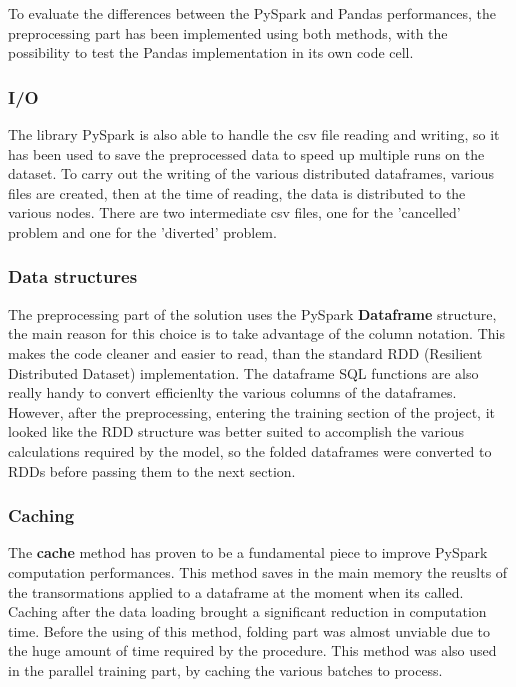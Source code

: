 \documentclass[
	letterpaper, %
	10pt, %
]{class}
\begin{document}
To evaluate the differences between the PySpark and Pandas performances, the preprocessing part has been implemented using both methods, with the possibility to test the Pandas implementation in its own code cell.

\subsubsection{I/O}

The library PySpark is also able to handle the csv file reading and writing, so it has been used to save the preprocessed data to speed up multiple runs on the dataset. To carry out the writing of the various distributed dataframes, various files are created, then at the time of reading, the data is distributed to the various nodes. There are two intermediate csv files, one for the 'cancelled' problem and one for the 'diverted' problem.\\

\subsubsection{Data structures}

The preprocessing part of the solution uses the PySpark \textbf{Dataframe} structure, the main reason for this choice is to take advantage of the column notation. This makes the code cleaner and easier to read, than the standard RDD (Resilient Distributed Dataset) implementation. The dataframe SQL functions are also really handy to convert efficienlty the various columns of the dataframes.
However, after the preprocessing, entering the training section of the project, it looked like the RDD structure was better suited to accomplish the various calculations required by the model, so the folded dataframes were converted to RDDs before passing them to the next section.

\subsubsection{Caching}

The \textbf{cache} method has proven to be a fundamental piece to improve PySpark computation performances. This method saves in the main memory the reuslts of the transormations applied to a dataframe at the moment when its called. Caching after the data loading brought a significant reduction in computation time. Before the using of this method, folding part was almost unviable due to the huge amount of time required by the procedure.
This method was also used in the parallel training part, by caching the various batches to process.
\end{document}
